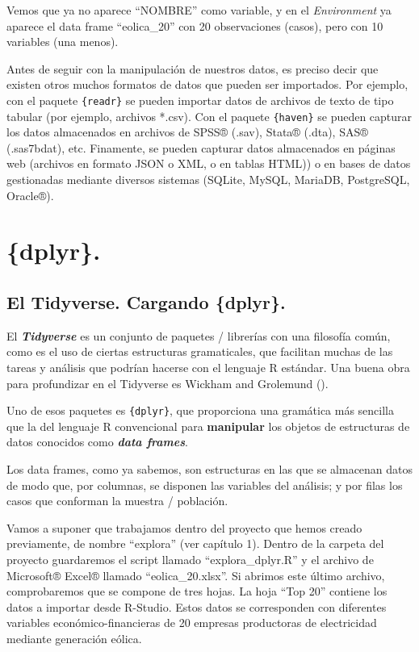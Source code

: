 \documentclass[
]{book}
\begin{document}
Vemos que ya no aparece ``NOMBRE'' como variable, y en el \emph{Environment} ya aparece el data frame ``eolica\_20'' con 20 observaciones (casos), pero con 10 variables (una menos).

Antes de seguir con la manipulación de nuestros datos, es preciso decir que existen otros muchos formatos de datos que pueden ser importados. Por ejemplo, con el paquete \texttt{\{readr\}} se pueden importar datos de archivos de texto de tipo tabular (por ejemplo, archivos *.csv). Con el paquete \texttt{\{haven\}} se pueden capturar los datos almacenados en archivos de SPSS® (.sav), Stata® (.dta), SAS® (.sas7bdat), etc. Finamente, se pueden capturar datos almacenados en páginas web (archivos en formato JSON o XML, o en tablas HTML)) o en bases de datos gestionadas mediante diversos sistemas (SQLite, MySQL, MariaDB, PostgreSQL, Oracle®).

\section{\{dplyr\}.}\label{dplyr.}

\subsection{El Tidyverse. Cargando \{dplyr\}.}\label{el-tidyverse.-cargando-dplyr.}

El \textbf{\emph{Tidyverse}} es un conjunto de paquetes / librerías con una filosofía común, como es el uso de ciertas estructuras gramaticales, que facilitan muchas de las tareas y análisis que podrían hacerse con el lenguaje R estándar. Una buena obra para profundizar en el Tidyverse es Wickham and Grolemund ().

Uno de esos paquetes es \texttt{\{dplyr\}}, que proporciona una gramática más sencilla que la del lenguaje R convencional para \textbf{manipular} los objetos de estructuras de datos conocidos como \textbf{\emph{data frames}}.

Los data frames, como ya sabemos, son estructuras en las que se almacenan datos de modo que, por columnas, se disponen las variables del análisis; y por filas los casos que conforman la muestra / población.

Vamos a suponer que trabajamos dentro del proyecto que hemos creado previamente, de nombre ``explora'' (ver capítulo 1). Dentro de la carpeta del proyecto guardaremos el script llamado ``explora\_dplyr.R'' y el archivo de Microsoft® Excel® llamado ``eolica\_20.xlsx''. Si abrimos este último archivo, comprobaremos que se compone de tres hojas. La hoja ``Top 20'' contiene los datos a importar desde R-Studio. Estos datos se corresponden con diferentes variables económico-financieras de 20 empresas productoras de electricidad mediante generación eólica.
\end{document}
